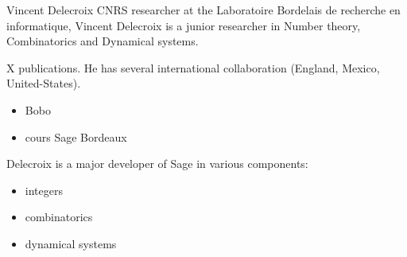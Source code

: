 \begin{participant}[PM=12,salary=2500]{Vincent Delecroix}
  CNRS researcher at the Laboratoire Bordelais de recherche en informatique, Vincent
  Delecroix is a junior researcher in Number theory, Combinatorics and Dynamical systems.

  X publications.  He has several international collaboration (England, Mexico,
  United-States).

  \begin{itemize}
\item  Bobo
\item  cours Sage Bordeaux
\end{itemize}

Delecroix is a major developer of Sage in various components:
\begin{itemize}
\item  integers
\item  combinatorics
\item dynamical systems
\end{itemize}
\end{participant}

